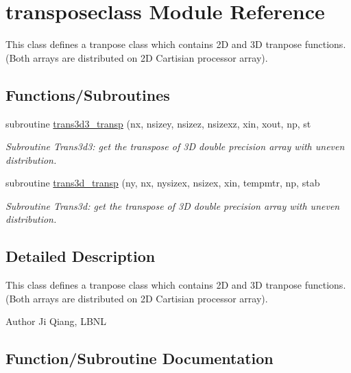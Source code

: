 \hypertarget{namespacetransposeclass}{}\section{transposeclass Module Reference}
\label{namespacetransposeclass}


This class defines a tranpose class which contains 2D and 3D tranpose functions. (Both arrays are distributed on 2D Cartisian processor array).  


\subsection*{Functions/\+Subroutines}
\begin{DoxyCompactItemize}
\item 
subroutine \mbox{\hyperlink{namespacetransposeclass_ac2cdff8d4fbeb19df8a8ba2ff562b8c2}{trans3d3\+\_\+transp}} (nx, nsizey, nsizez, nsizexz, xin, xout, np, st
\begin{DoxyCompactList}\small\item\em Subroutine Trans3d3\+: get the transpose of 3D double precision array with uneven distribution. \end{DoxyCompactList}\item 
subroutine \mbox{\hyperlink{namespacetransposeclass_a53eeae5e11acd8c39e03fb8672f2d90e}{trans3d\+\_\+transp}} (ny, nx, nysizex, nsizex, xin, tempmtr, np, stab
\begin{DoxyCompactList}\small\item\em Subroutine Trans3d\+: get the transpose of 3D double precision array with uneven distribution. \end{DoxyCompactList}\end{DoxyCompactItemize}


\subsection{Detailed Description}
This class defines a tranpose class which contains 2D and 3D tranpose functions. (Both arrays are distributed on 2D Cartisian processor array). 

\begin{DoxyAuthor}{Author}
Ji Qiang, L\+B\+NL 
\end{DoxyAuthor}


\subsection{Function/\+Subroutine Documentation}
\mbox{\label{namespacetransposeclass_ac2cdff8d4fbeb19df8a8ba2ff562b8c2}} 
